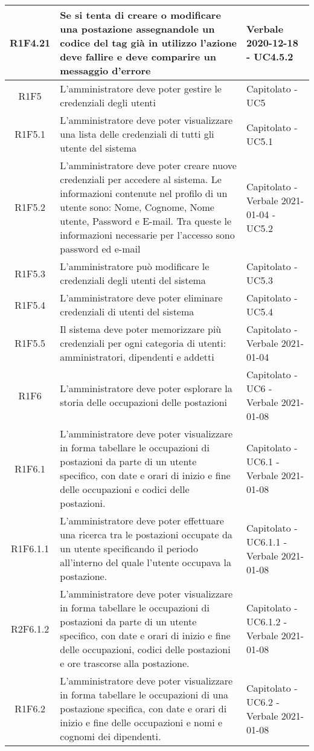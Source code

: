 \begin{center}
\begin{longtable}{|c|p{10cm}|p{4cm}|}
			R1F4.21&Se si tenta di creare o modificare una postazione assegnandole un codice del tag già in utilizzo l'azione deve fallire e deve comparire un messaggio d'errore	&Verbale 2020-12-18 - UC4.5.2 	\\
					\hline
			R1F5&L'amministratore deve poter gestire le credenziali degli utenti	& Capitolato - UC5		\\
					\hline
R1F5.1&L'amministratore deve poter visualizzare una lista delle credenziali di tutti gli utente del sistema	& Capitolato - UC5.1	\\
					\hline
R1F5.2&L'amministratore deve poter creare nuove credenziali per accedere al sistema. Le informazioni contenute nel profilo di un utente sono: Nome, Cognome, Nome utente, Password e E-mail. Tra queste le informazioni necessarie per l'accesso sono password ed e-mail	& Capitolato - Verbale 2021-01-04 - UC5.2	\\
						\hline
			R1F5.3&L'amministratore può modificare le credenziali degli utenti del sistema	&Capitolato - UC5.3 	\\
					\hline
			R1F5.4&L'amministratore deve poter eliminare credenziali di utenti del sistema	& Capitolato - UC5.4	\\
					\hline
R1F5.5&Il sistema deve poter memorizzare più credenziali per ogni categoria di utenti: amministratori, dipendenti e addetti	& Capitolato - Verbale 2021-01-04	\\
					\hline
R1F6&L'amministratore deve poter esplorare la storia delle occupazioni delle postazioni	& Capitolato - UC6 - Verbale 2021-01-08	\\
						\hline
			R1F6.1&L'amministratore deve poter visualizzare in forma tabellare le occupazioni di postazioni da parte di un utente specifico, con date e orari di inizio e fine delle occupazioni e codici delle postazioni.	&Capitolato - UC6.1 - Verbale 2021-01-08	\\
					\hline
			R1F6.1.1&L'amministratore deve poter effettuare una ricerca tra le postazioni occupate da un utente specificando il periodo all'interno del quale l'utente occupava la postazione. & 	Capitolato - UC6.1.1 - Verbale 2021-01-08\\
					\hline
			R2F6.1.2&L'amministratore deve poter visualizzare in forma tabellare le occupazioni di postazioni da parte di un utente specifico, con date e orari di inizio e fine delle occupazioni,  codici delle postazioni e ore trascorse alla postazione. & 	Capitolato - UC6.1.2 - Verbale 2021-01-08\\
			\hline
			R1F6.2&L'amministratore deve poter visualizzare in forma tabellare le occupazioni di una postazione specifica, con date e orari di inizio e fine delle occupazioni e nomi e cognomi dei dipendenti.	&Capitolato - UC6.2 - Verbale 2021-01-08	\\

\end{longtable}
\end{center}
